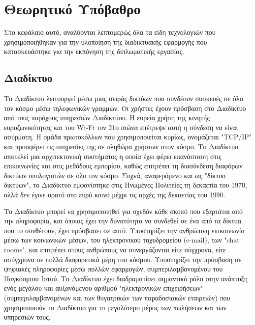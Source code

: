 \chapter{Θεωρητικό Υπόβαθρο}
Στο κεφάλαιο αυτό, αναλύονται λεπτομερώς όλα τα είδη τεχνολογιών που χρησιμοποιήθηκαν για την υλοποίηση της διαδικτυακής εφαρμογής που κατασκευάστηκε για την εκπόνηση της διπλωματικής εργασίας.

\section{Διαδίκτυο}
Το Διαδίκτυο λειτουργεί μέσω μιας σειράς δικτύων που συνδέουν συσκευές σε όλο τον κόσμο μέσω τηλεφωνικών γραμμών. Οι χρήστες έχουν πρόσβαση στο Διαδίκτυο από τους παρόχους υπηρεσιών Διαδικτύου. Η ευρεία χρήση της κινητής ευρυζωνικότητας και του Wi-Fi τον 21ο αιώνα επέτρεψε αυτή η σύνδεση να είναι ασύρματη. Η ομάδα πρωτοκόλλων που χρησιμοποιείται κυρίως, ονομάζεται "TCP/IP" και προσφέρει τις υπηρεσίες της σε πληθώρα χρήστων στον κόσμο. Το Διαδίκτυο αποτελεί μια αρχιτεκτονική συστήματος η οποία έχει φέρει επανάσταση στις επικοινωνίες και στις μεθόδους εμπορίου, καθώς επιτρέπει τη διασύνδεση διαφόρων δικτύων υπολογιστών σε όλο τον κόσμο. Συχνά, αναφερόμενο και ως "δίκτυο δικτύων", το Διαδίκτυο εμφανίστηκε στις Ηνωμένες Πολιτείες τη δεκαετία του 1970, αλλά δεν έγινε ορατό στο ευρύ κοινό μέχρι τις αρχές της δεκαετίας του 1990. \cite{internet_britannica}

Το Διαδίκτυο μπορεί να χρησιμοποιηθεί για σχεδόν κάθε σκοπό που εξαρτάται από την πληροφορία, και όποιος έχει την δυνατότητα να συνδεθεί σε ένα από τα δίκτυα που το συνθέτουν, έχει πρόσβασει σε αυτό. Υποστηρίζει την ανθρώπινη επικοινωνία μέσω των κοινωνικών μέσων, του ηλεκτρονικού ταχυδρομείου (e-mail), των "chat rooms", και επιτρέπει στους ανθρώπους να συνεργάζονται είτε σύγχρονα, είτε ασύγχρονα σε πολλά διαφορετικά μέρη του κόσμου. Υποστηρίζει την πρόσβαση σε ψηφιακές πληροφορίες μέσω πολλών εφαρμογών, συμπεριλαμβανομένου του Παγκόσμιου Ιστού. Το Διαδίκτυο έχει διαδραματίσει σημαντικό ρόλο στην ανάπτυξη ενός μεγάλου και αυξανόμενου αριθμού "ηλεκτρονικών επιχειρήσεων" (συμπεριλαμβανομένων και των θυγατρικών των παραδοσιακών εταιρειών) που χρησιμοποιούν το Διαδίκτυο για το μεγαλύτερο μέρος των πωλήσεων και των υπηρεσιών τους.

